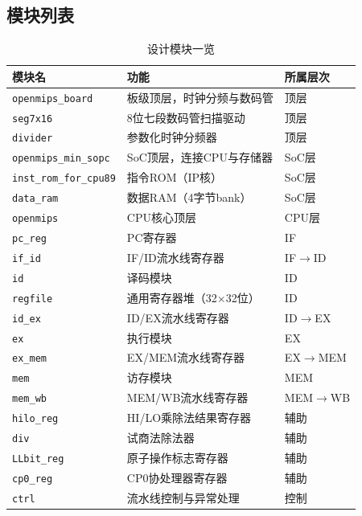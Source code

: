 \subsection{模块列表}

\begin{table}[H]
    \centering
    \caption{设计模块一览}
    \begin{tabular}{lll}
        \toprule
        \textbf{模块名} & \textbf{功能} & \textbf{所属层次} \\
        \midrule
        \texttt{openmips\_board} & 板级顶层，时钟分频与数码管 & 顶层 \\
        \texttt{seg7x16} & 8位七段数码管扫描驱动 & 顶层 \\
        \texttt{divider} & 参数化时钟分频器 & 顶层 \\
        \texttt{openmips\_min\_sopc} & SoC顶层，连接CPU与存储器 & SoC层 \\
        \texttt{inst\_rom\_for\_cpu89} & 指令ROM（IP核） & SoC层 \\
        \texttt{data\_ram} & 数据RAM（4字节bank） & SoC层 \\
        \texttt{openmips} & CPU核心顶层 & CPU层 \\
        \texttt{pc\_reg} & PC寄存器 & IF \\
        \texttt{if\_id} & IF/ID流水线寄存器 & IF$\to$ID \\
        \texttt{id} & 译码模块 & ID \\
        \texttt{regfile} & 通用寄存器堆（32$\times$32位） & ID \\
        \texttt{id\_ex} & ID/EX流水线寄存器 & ID$\to$EX \\
        \texttt{ex} & 执行模块 & EX \\
        \texttt{ex\_mem} & EX/MEM流水线寄存器 & EX$\to$MEM \\
        \texttt{mem} & 访存模块 & MEM \\
        \texttt{mem\_wb} & MEM/WB流水线寄存器 & MEM$\to$WB \\
        \texttt{hilo\_reg} & HI/LO乘除法结果寄存器 & 辅助 \\
        \texttt{div} & 试商法除法器 & 辅助 \\
        \texttt{LLbit\_reg} & 原子操作标志寄存器 & 辅助 \\
        \texttt{cp0\_reg} & CP0协处理器寄存器 & 辅助 \\
        \texttt{ctrl} & 流水线控制与异常处理 & 控制 \\
        \bottomrule
    \end{tabular}
\end{table}

